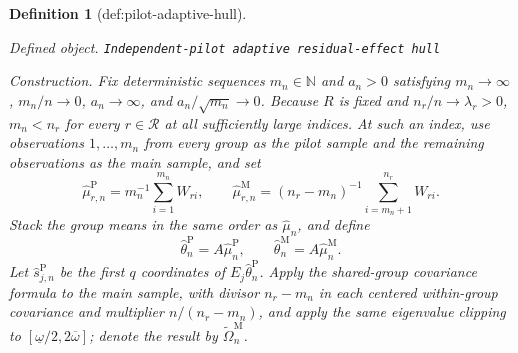 \documentclass{article}
\newtheorem{definition}{Definition}
\begin{document}
\begin{definition}[def:pilot-adaptive-hull]\label{def:pilot-adaptive-hull}
\par\smallskip\noindent\emph{Defined object.} \texttt{Independent-\allowbreak{}pilot adaptive residual-\allowbreak{}effect hull}
\par\smallskip\noindent\emph{Construction.} Fix deterministic sequences \(m_n\in\mathbb N\) and \(a_n>0\) satisfying \(m_n\to\infty\), \(m_n/n\to0\), \(a_n\to\infty\), and \(a_n/\sqrt{m_n}\to0\).  Because \(R\) is fixed and \(n_r/n\to\lambda_r>0\), \(m_n<n_r\) for every \(r\in\mathcal R\) at all sufficiently large indices.  At such an index, use observations \(1,\ldots,m_n\) from every group as the pilot sample and the remaining observations as the main sample, and set
\[
 \widehat\mu_{r,n}^{\mathrm P}
 =m_n^{-1}\sum_{i=1}^{m_n}W_{ri},
 \qquad
 \widehat\mu_{r,n}^{\mathrm M}
 =(n_r-m_n)^{-1}\sum_{i=m_n+1}^{n_r}W_{ri}.
\]
Stack the group means in the same order as \(\widehat\mu_n\), and define
\[
 \widehat\theta_n^{\mathrm P}=A\widehat\mu_n^{\mathrm P},
 \qquad
 \widehat\theta_n^{\mathrm M}=A\widehat\mu_n^{\mathrm M}.
\]
Let \(\widehat s_{j,n}^{\mathrm P}\) be the first \(q\) coordinates of \(E_j\widehat\theta_n^{\mathrm P}\).  Apply the shared-group covariance formula to the main sample, with divisor \(n_r-m_n\) in each centered within-group covariance and multiplier \(n/(n_r-m_n)\), and apply the same eigenvalue clipping to \([\underline\omega/2,2\overline\omega]\); denote the result by \(\widetilde\Omega_n^{\mathrm M}\).


\end{definition}
\end{document}
